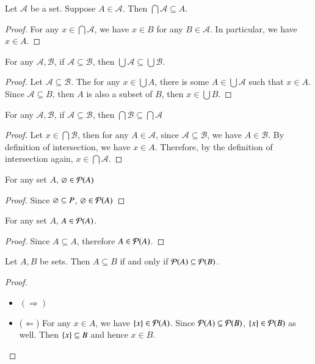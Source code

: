 \begin{prop}
    Let $\mathscr A$ be a set. Suppose $A\in\mathscr A$. Then $\bigcap\mathscr A\subseteq A$.
\end{prop}
\begin{proof}
    For any $x\in \bigcap\mathscr A$, we have $x\in B$ for any $B\in\mathscr A$. In particular, we have $x\in A$. 
\end{proof}
\begin{prop}
    For any $\mathscr A, \mathscr B$, if $\mathscr A\subseteq \mathscr B$, then $\bigcup\mathscr A\subseteq \bigcup\mathscr B$.
\end{prop}
\begin{proof}
    Let $\mathscr A\subseteq \mathscr B$. The for any $x\in \bigcup A$, there is some $A\in\bigcup \mathscr A$ such that $x\in A$. Since $\mathscr A\subseteq B$, then $A$ is also a subset of $B$, then $x\in \bigcup B$.
\end{proof}
\begin{prop}
    For any $\mathscr A, \mathscr B$, if $\mathscr A\subseteq \mathscr B$, then $\bigcap \mathscr B\subseteq \bigcap\mathscr A$
\end{prop}
\begin{proof}
    Let $x\in\bigcap\mathscr B$, then for any $A\in\mathscr A$, since $\mathscr A\subseteq \mathscr B$, we have $A\in\mathscr B$. By definition of intersection, we have $x\in A$. Therefore, by the definition of intersection again, $x\in \bigcap\mathscr A$.
\end{proof}
\begin{prop}
    For any set $A$, $\varnothing\in\mathcal{P}(A)$
\end{prop}
\begin{proof}
    Since $\varnothing\subseteq P$, $\varnothing\in \mathcal{P}(A)$
\end{proof}
\begin{prop}
    For any set $A$, $A\in\mathcal{P}(A)$.
\end{prop}
\begin{proof}
    Since $A\subseteq A$, therefore $A\in\mathcal{P}(A)$.
\end{proof}
\begin{prop}
    Let $A,B$ be sets. Then $A\subseteq B$ if and only if $\mathcal{P}(A)\subseteq \mathcal{P}(B)$.
\end{prop}
\begin{proof}
    ~
    \begin{itemize}
        \item $(\Rightarrow)$ 
        \item ($\Leftarrow$) For any $x\in A$, we have $\{x\}\in\mathcal{P}(A)$. Since $\mathcal{P}(A)\subseteq \mathcal{P}(B)$, $\{x\}\in\mathcal{P}(B)$ as well. Then $\{x\}\subseteq B$ and hence $x\in B$.
    \end{itemize}
\end{proof}